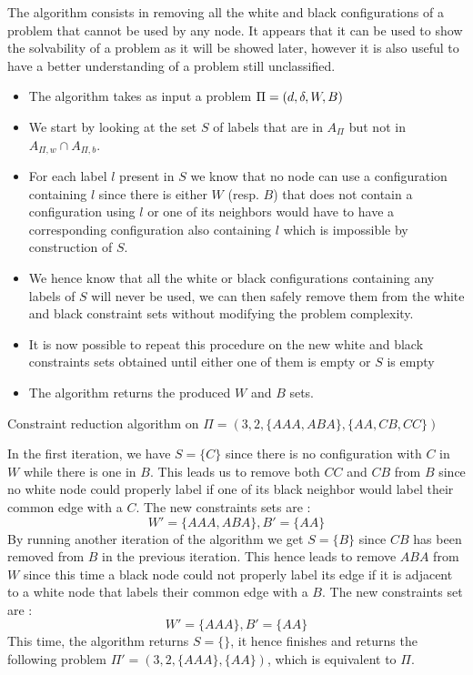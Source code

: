 The algorithm consists in removing all the white and black configurations of a problem that cannot be used by any node. It appears that it can be used to show the solvability of a problem as it will be showed later, however it is also useful to have a better understanding of a problem still unclassified.
\begin{itemize}
    \item The algorithm takes as input a problem $\Pi = (d,\delta,W,B)$
    \item We start by looking at the set $S$ of labels that are in $A_{\Pi}$ but not in  $A_{\Pi,w} \cap A_{\Pi,b}$.
    \item For each label $l$ present in $S$ we know that no node can use a configuration containing $l$ since there is either $W$ (resp. $B$) that does not contain a configuration using $l$ or one of its neighbors would have to have a corresponding configuration also containing $l$ which is impossible by construction of $S$.
    \item We hence know that all the white or black configurations containing any labels of $S$ will never be used, we can then safely remove them from the white and black constraint sets without modifying the problem complexity.
    \item It is now possible to repeat this procedure on the new white and black constraints sets obtained until either one of them is empty or $S$ is empty
    \item The algorithm returns the produced $W$ and $B$ sets.
\end{itemize}
\begin{exmp} Constraint reduction algorithm on $\Pi = (3, 2, \{AAA, ABA\}, \{AA, CB, CC\})$

In the first iteration, we have $S = \{C\}$ since there is no configuration with $C$ in $W$ while there is one in $B$.
This leads us to remove both $CC$ and $CB$ from $B$ since no white node could properly label if one of its black neighbor would label their common edge with a $C$.
The new constraints sets are :
$$W' = \{AAA, ABA\}, B' = \{AA\}$$
By running another iteration of the algorithm we get $S = \{B\}$ since $CB$ has been removed from $B$ in the previous iteration.
This hence leads to remove $ABA$ from $W$ since this time a black node could not properly label its edge if it is adjacent to a white node that labels their common edge with a $B$.
The new constraints set are :
$$W' = \{AAA\}, B' = \{AA\}$$
This time, the algorithm returns $S = \{\}$, it hence finishes and returns the following problem $\Pi' = (3, 2, \{AAA\}, \{AA\})$, which is equivalent to $\Pi$.
\end{exmp}

